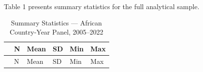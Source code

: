 \documentclass[
  12pt,
  letterpaper,
  DIV=11,
  numbers=noendperiod]{scrartcl}
\begin{document}
Table 1 presents summary statistics for the full analytical sample.

\begin{longtable}[]{@{}
  >{\raggedright\arraybackslash}p{}
  >{\raggedleft\arraybackslash}p{}
  >{\raggedleft\arraybackslash}p{}
  >{\raggedleft\arraybackslash}p{}
  >{\raggedleft\arraybackslash}p{}
  >{\raggedleft\arraybackslash}p{}@{}}
\caption{Summary Statistics --- African Country-Year Panel,
2005--2022}\label{tbl-summary}\tabularnewline
\toprule\noalign{}
\begin{minipage}[b]{\linewidth}\raggedright
\end{minipage} & \begin{minipage}[b]{\linewidth}\raggedleft
N
\end{minipage} & \begin{minipage}[b]{\linewidth}\raggedleft
Mean
\end{minipage} & \begin{minipage}[b]{\linewidth}\raggedleft
SD
\end{minipage} & \begin{minipage}[b]{\linewidth}\raggedleft
Min
\end{minipage} & \begin{minipage}[b]{\linewidth}\raggedleft
Max
\end{minipage} \\
\midrule\noalign{}
\endfirsthead
\toprule\noalign{}
\begin{minipage}[b]{\linewidth}\raggedright
\end{minipage} & \begin{minipage}[b]{\linewidth}\raggedleft
N
\end{minipage} & \begin{minipage}[b]{\linewidth}\raggedleft
Mean
\end{minipage} & \begin{minipage}[b]{\linewidth}\raggedleft
SD
\end{minipage} & \begin{minipage}[b]{\linewidth}\raggedleft
Min
\end{minipage} & \begin{minipage}[b]{\linewidth}\raggedleft
Max
\end{minipage} \\

\end{longtable}
\end{document}
